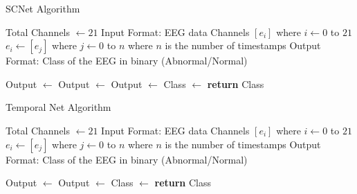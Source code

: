 \documentclass[11pt]{article}
\begin{document}
\begin{algorithm}
\caption{SCNet Algorithm}
    \begin{algorithmic}[1]
     
        \State Total Channels $\gets 21$
        \State Input Format: EEG data Channels $[e_i]$ where $i \gets 0$ to $21$
        \State $e_i \gets [e_j]$ where $j \gets 0$ to $n$ where $n$ is the number of timestamps
        \State 
        \State Output Format: Class of the EEG in binary (Abnormal/Normal)
        \State

        \State Output $\gets$  
        \State Output $\gets$ 
        \State Output $\gets$ 
        \State Class $\gets$ 
        \State \textbf{return} Class
    \EndProcedure
    \end{algorithmic}
\end{algorithm}

\begin{algorithm}
\caption{Temporal Net Algorithm}
    \begin{algorithmic}[1]
     
        \State Total Channels $\gets 21$
        \State Input Format: EEG data Channels $[e_i]$ where $i \gets 0$ to $21$
        \State $e_i \gets [e_j]$ where $j \gets 0$ to $n$ where $n$ is the number of timestamps
        \State 
        \State Output Format: Class of the EEG in binary (Abnormal/Normal)
        \State

        \State Output $\gets$  
        \State Output $\gets$ 
        \State Class $\gets$ 
        \State \textbf{return} Class
    \EndProcedure
    \end{algorithmic}
    
\end{algorithm}
\end{document}
